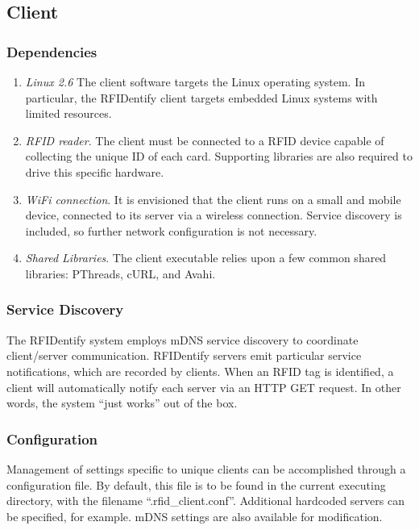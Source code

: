 \documentclass{article}
\begin{document}
	\subsection{Client}

        \subsubsection{Dependencies}
        \begin{enumerate}
          \item \textit{Linux 2.6}
            The client software targets the Linux operating system. 
            In particular, the RFIDentify client targets embedded Linux systems with limited resources.

          \item \textit{RFID reader}. 
            The client must be connected to a RFID device capable of collecting the unique ID of each card. 
            Supporting libraries are also required to drive this specific hardware.

          \item \textit{WiFi connection}.
            It is envisioned that the client runs on a small and mobile device, connected to its server
            via a wireless connection. Service discovery is included, so further network configuration is not
            necessary.

          \item \textit{Shared Libraries}.
            The client executable relies upon a few common shared libraries: PThreads, cURL, and Avahi.

        \end{enumerate}
        
        \subsubsection{Service Discovery}
        The RFIDentify system employs mDNS service discovery to coordinate client/server communication. 
        RFIDentify servers emit particular service notifications, which are recorded by clients.  When an
        RFID tag is identified, a client will automatically notify each server via an HTTP GET request.
        In other words, the system ``just works'' out of the box.

	\subsubsection{Configuration}
        Management of settings specific to unique clients can be accomplished through a configuration file.
        By default, this file is to be found in the current executing directory, with the filename ``.rfid_client.conf''.
        Additional hardcoded servers can be specified, for example. mDNS settings are also available for 
        modification.
\end{document}
